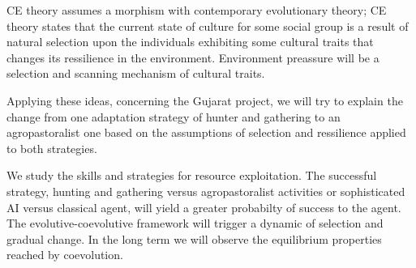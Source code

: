 \documentclass[11pt,oneside,a4paper,openright]{report}
\begin{document}
CE theory assumes a morphism with contemporary evolutionary theory; CE theory states that the current state of culture for some social group is a result of natural selection upon the individuals exhibiting some cultural traits that changes its ressilience in the environment. Environment preassure will be a selection and scanning mechanism of cultural traits.

Applying these ideas, concerning the Gujarat project, we will try to explain the change from one adaptation strategy of hunter and gathering to an agropastoralist one based on the assumptions of selection and ressilience applied to both strategies. 



We study the skills and strategies for resource exploitation. The successful strategy, hunting and gathering versus agropastoralist activities or sophisticated AI versus classical agent, will yield a greater probabilty of success to the agent. The evolutive-coevolutive framework will trigger a dynamic of selection and gradual change. In the long term we will observe the equilibrium properties reached by coevolution. 

\end{document}
